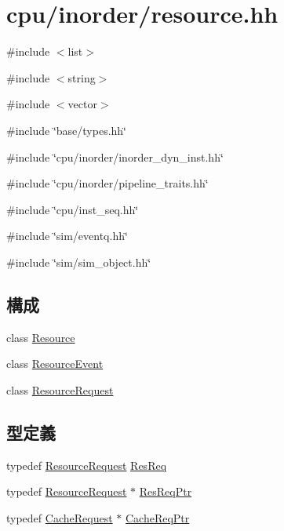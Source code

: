 \hypertarget{resource_8hh}{
\section{cpu/inorder/resource.hh}
\label{resource_8hh}
}
{\ttfamily \#include $<$list$>$}\par
{\ttfamily \#include $<$string$>$}\par
{\ttfamily \#include $<$vector$>$}\par
{\ttfamily \#include \char`\"{}base/types.hh\char`\"{}}\par
{\ttfamily \#include \char`\"{}cpu/inorder/inorder\_\-dyn\_\-inst.hh\char`\"{}}\par
{\ttfamily \#include \char`\"{}cpu/inorder/pipeline\_\-traits.hh\char`\"{}}\par
{\ttfamily \#include \char`\"{}cpu/inst\_\-seq.hh\char`\"{}}\par
{\ttfamily \#include \char`\"{}sim/eventq.hh\char`\"{}}\par
{\ttfamily \#include \char`\"{}sim/sim\_\-object.hh\char`\"{}}\par
\subsection*{構成}
\begin{DoxyCompactItemize}
\item 
class \hyperlink{classResource}{Resource}
\item 
class \hyperlink{classResourceEvent}{ResourceEvent}
\item 
class \hyperlink{classResourceRequest}{ResourceRequest}
\end{DoxyCompactItemize}
\subsection*{型定義}
\begin{DoxyCompactItemize}
\item 
typedef \hyperlink{classResourceRequest}{ResourceRequest} \hyperlink{resource_8hh_add9cca5e4344952e69384bf72b3b3941}{ResReq}
\item 
typedef \hyperlink{classResourceRequest}{ResourceRequest} $\ast$ \hyperlink{resource_8hh_a57185e394b4c95ed634366fa05807555}{ResReqPtr}
\item 
typedef \hyperlink{classCacheRequest}{CacheRequest} $\ast$ \hyperlink{resource_8hh_a846cef203ab93202ce46ec7a798c96b8}{CacheReqPtr}
\end{DoxyCompactItemize}


